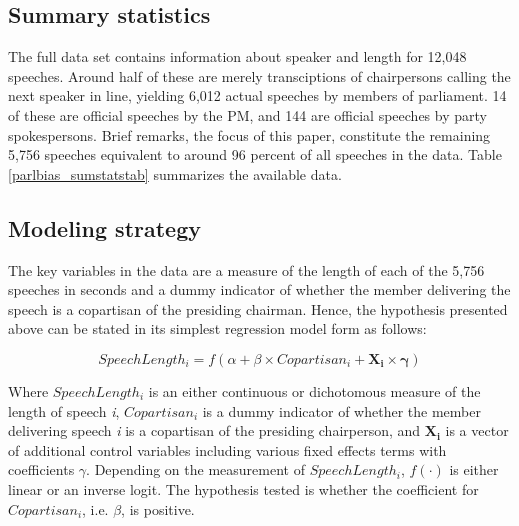 \documentclass[12pt,a4paper]{article}
\begin{document}
\subsection{Summary statistics}
The full data set contains information about speaker and length for 12,048 speeches. Around half of these are merely transciptions of chairpersons calling the next speaker in line, yielding 6,012 actual speeches by members of parliament. 14 of these are official speeches by the PM, and 144 are official speeches by party spokespersons. Brief remarks, the focus of this paper, constitute the remaining 5,756 speeches equivalent to around 96 percent of all speeches in the data. Table \ref{parlbias_sumstatstab} summarizes the available data. 




\subsection{Modeling strategy}
The key variables in the data are a measure of the length of each of the 5,756 speeches in seconds and a dummy indicator of whether the member delivering the speech is a copartisan of the presiding chairman. Hence, the hypothesis presented above can be stated in its simplest regression model form as follows:

\begin{equation}\label{model}
SpeechLength_i = f( \alpha + \beta \times Copartisan_i + \mathbf{X_i\times\gamma} )
\end{equation}

Where $SpeechLength_i$ is an either continuous or dichotomous measure of the length of speech \textit{i}, $Copartisan_i$ is a dummy indicator of whether the member delivering speech \textit{i} is a copartisan of the presiding chairperson, and $\mathbf{X_i}$ is a vector of additional control variables including various fixed effects terms with coefficients $\gamma$. Depending on the measurement of $SpeechLength_i$, $f(\cdot)$ is either linear or an inverse logit. The hypothesis tested is whether the coefficient for \textit{$Copartisan_i$}, i.e. \textit{$\beta$}, is positive.
\end{document}
